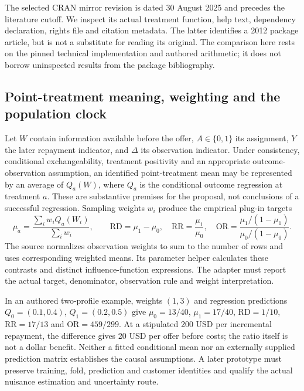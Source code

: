 The selected CRAN mirror revision is dated 30 August 2025 and precedes the
literature cutoff. We inspect its actual treatment function, help text,
dependency declaration, rights file and citation metadata. The latter identifies
a 2012 package article, but is not a substitute for reading its original.
The comparison here rests on the pinned technical implementation and authored
arithmetic; it does not borrow uninspected results from the package bibliography.
\citep{exec24_tmle_sources}

\subsection{Point-treatment meaning, weighting and the population clock}
Let $W$ contain information available before the offer, $A\in\{0,1\}$ its
assignment, $Y$ the later repayment indicator, and $\Delta$ its observation
indicator. Under consistency, conditional exchangeability, treatment positivity
and an appropriate outcome-observation assumption, an identified point-treatment
mean may be represented by an average of $Q_a(W)$, where $Q_a$ is the conditional
outcome regression at treatment $a$. These are substantive premises for the
proposal, not conclusions of a successful regression. Sampling weights $w_i$
produce the empirical plug-in targets
\[
 \mu_a=\frac{\sum_i w_i Q_a(W_i)}{\sum_i w_i},\qquad
 \mathrm{RD}=\mu_1-\mu_0,\quad
 \mathrm{RR}=\frac{\mu_1}{\mu_0},\quad
 \mathrm{OR}=\frac{\mu_1/(1-\mu_1)}{\mu_0/(1-\mu_0)}.
\]
The source normalizes observation weights to sum to the number of rows and
uses corresponding weighted means. Its parameter helper calculates these
contrasts and distinct influence-function expressions. The adapter must report
the actual target, denominator, observation rule and weight interpretation.
\citep{exec24_tmle_sources}

In an authored two-profile example, weights $(1,3)$ and regression predictions
$Q_0=(0.1,0.4)$, $Q_1=(0.2,0.5)$ give $\mu_0=13/40$, $\mu_1=17/40$,
$\mathrm{RD}=1/10$, $\mathrm{RR}=17/13$ and $\mathrm{OR}=459/299$.
At a stipulated 200 USD per incremental repayment, the difference gives
20 USD per offer before costs; the ratio itself is not a dollar benefit.
Neither a fitted conditional mean nor an externally supplied prediction matrix
establishes the causal assumptions. A later prototype must preserve training,
fold, prediction and customer identities and qualify the actual nuisance
estimation and uncertainty route.
\citep{exec24_tmle_contract}

